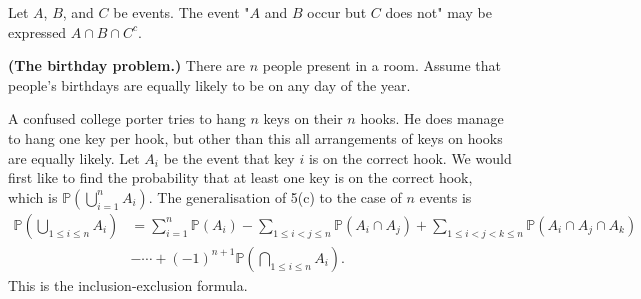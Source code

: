 \documentclass[answers]{exam}
\begin{document}
\begin{questions}
\question%
Let $A$, $B$, and $C$ be events. The event "$A$ and $B$ occur but $C$ does not" may be expressed $A\cap B\cap C^c$.



\question%
\textbf{(The birthday problem.)} There are $n$ people present in a room. Assume that people's birthdays are equally likely to be on any day of the year.



\question%
A confused college porter tries to hang $n$ keys on their $n$ hooks. He does manage to hang one key per hook, but other than this all arrangements of keys on hooks are equally likely. Let $A_i$ be the event that key $i$ is on the correct hook. We would first like to find the probability that at least one key is on the correct hook, which is $\mathbb{P}(\bigcup_{i=1}^n A_i)$. The generalisation of 5(c) to the case of $n$ events is \begin{align*}
	\mathbb{P}\left(\bigcup_{1 \leq i \leq n} A_i\right)
		&=\sum_{i=1}^n \mathbb{P}(A_i)-\sum_{1 \leq i<j \leq n} \mathbb{P}(A_i \cap A_j)+\sum_{1 \leq i<j<k \leq n} \mathbb{P}(A_i \cap A_j \cap A_k) \\
		&-\cdots+(-1)^{n+1} \mathbb{P}\left(\bigcap_{1 \leq i \leq n} A_i\right).
\end{align*} This is the inclusion-exclusion formula.
\begin{parts}

\end{parts}
\end{questions}
\end{document}
